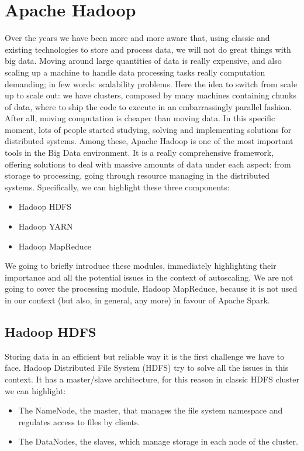 \documentclass[12pt,twoside,cucitura]{toptesi}
\begin{document}
\section{Apache Hadoop}
Over the years we have been more and more aware that, using classic and existing technologies to store and process data, we will not do great things with big data. Moving around large quantities of data is really expensive, and also scaling up a machine to handle data processing tasks really computation demanding; in few words: scalability problems. Here the idea to switch from scale up to scale out: we have clusters, composed by many machines containing chunks of data, where to ship the code to execute in an embarrassingly parallel fashion. After all, moving computation is cheaper than moving data. In this specific moment, lots of people started studying, solving and implementing solutions for distributed systems. Among these, Apache Hadoop \cite{hadoop} is one of the most important tools in the Big Data environment. It is a really comprehensive framework, offering solutions to deal with massive amounts of data under each aspect: from storage to processing, going through resource managing in the distributed systems. Specifically, we can highlight these three components:
\begin{itemize}
  \item Hadoop HDFS
  \item Hadoop YARN
  \item Hadoop MapReduce
\end{itemize} 

We going to briefly introduce these modules, immediately highlighting their importance and all the potential issues in the context of autoscaling. We are not going to cover the processing module, Hadoop MapReduce, because it is not used in our context (but also, in general, any more) in favour of Apache Spark.

\subsection{Hadoop HDFS}
Storing data in an efficient but reliable way it is the first challenge we have to face. Hadoop Distributed File System (HDFS) \cite{hdfs} try to solve all the issues in this context. It has a master/slave architecture, for this reason in classic HDFS cluster we can highlight:
\begin{itemize}
  \item The NameNode, the master, that manages the file system namespace and regulates access to files by clients.
  \item The DataNodes, the slaves, which manage storage in each node of the cluster.
\end{itemize} 
\end{document}
